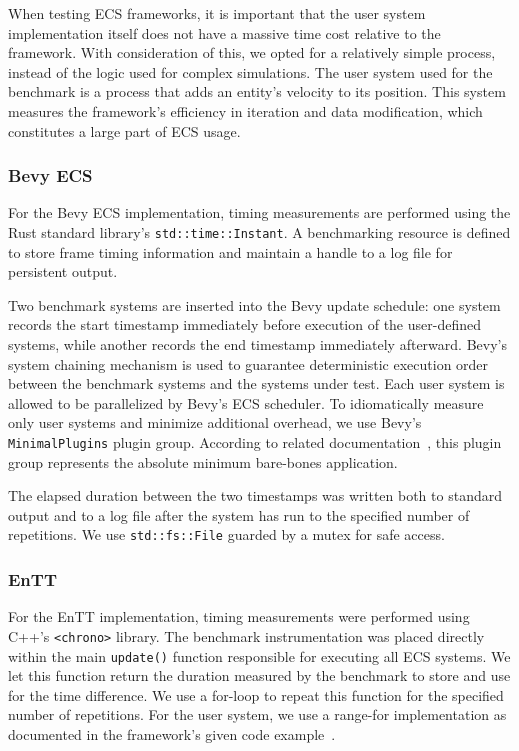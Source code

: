 When testing ECS frameworks, it is important that the user system implementation itself does not have a massive time cost relative to
the framework.
With consideration of this, we opted for a relatively simple process, instead of the logic used for complex simulations.
The user system used for the benchmark is a process that adds an entity's velocity to its position.
This system measures the framework's efficiency in iteration and data modification, which constitutes a large part of ECS usage.

\subsubsection*{Bevy ECS}

For the Bevy ECS implementation, timing measurements are performed using the Rust standard library's \texttt{std::time::Instant}.
A benchmarking resource is defined to store frame timing information and maintain a handle to a log file for persistent output.

Two benchmark systems are inserted into the Bevy update schedule: one system records the start timestamp immediately
before execution of the user-defined systems, while another records the end timestamp immediately afterward.
Bevy’s system chaining mechanism is used to guarantee deterministic execution order between the
benchmark systems and the systems under test.
Each user system is allowed to be parallelized by Bevy's ECS scheduler.
To idiomatically measure only user systems and minimize additional overhead, we use Bevy's \texttt{MinimalPlugins} plugin group.
According to related documentation~\cite{bevy_minimalplugins}, this plugin group represents the absolute minimum bare-bones application.

The elapsed duration between the two timestamps was written both to standard output and to a log file after the system
has run to the specified number of repetitions.
We use \texttt{std::fs::File} guarded by a mutex for safe access.

\subsubsection*{EnTT}

For the EnTT implementation, timing measurements were performed using C++’s \texttt{<chrono>} library.
The benchmark instrumentation was placed directly within the main \texttt{update()} function responsible for
executing all ECS systems.
We let this function return the duration measured by the benchmark to store and use for the time difference.
We use a for-loop to repeat this function for the specified number of repetitions.
For the user system, we use a range-for implementation as documented in the framework's given code example~\cite{ValtoLibraries_EnTT}.

